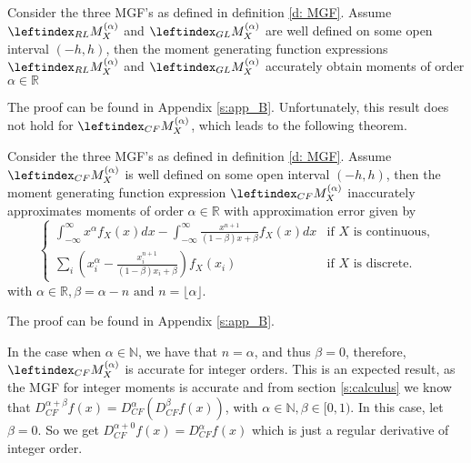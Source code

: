 \begin{theorem}\label{t: MGF_accurate}
     Consider the three MGF's as defined in definition \ref{d: MGF}. Assume \(\leftindex_{RL}{M}_X^{(\alpha)}\) and \(\leftindex_{GL}{M}_X^{(\alpha)}\) are well defined on some open interval \((-h, h)\), then the moment generating function expressions \(\leftindex_{RL}{M}_X^{(\alpha)}\) and \(\leftindex_{GL}{M}_X^{(\alpha)}\) accurately obtain moments of order \(\alpha \in \mathbb{R}\)
    
\end{theorem}
The proof can be found in Appendix \ref{s:app_B}.
\newline
Unfortunately, this result does not hold for \(\leftindex_{CF}{M}_X^{(\alpha)}\), which leads to the following theorem.

\begin{theorem}\label{t: MGF_inaccurate}
    Consider the three MGF's as defined in definition \ref{d: MGF}. Assume \(\leftindex_{CF}{M}_X^{(\alpha)}\) is well defined on some open interval \((-h, h)\), then the moment generating function expression \(\leftindex_{CF}{M}_X^{(\alpha)}\) inaccurately approximates moments of order \(\alpha \in \mathbb{R}\) with approximation error given by
    \[
\begin{cases} 
    \displaystyle \int_{-\infty}^{\infty} x^\alpha  f_X(x) dx -  \displaystyle \int_{-\infty}^{\infty}  \frac{x^{n+1} }{(1 - \beta)x + \beta} f_X(x) dx & \text{if } X \text{ is continuous,} \\ 
    \displaystyle \sum_{i} \left(x_i^\alpha -  \frac{x_i^{n+1} }{(1 - \beta)x_i + \beta}\right) f_X(x_i) & \text{if } X \text{ is discrete.} 
\end{cases}
\] with \(\alpha \in \mathbb{R}, \beta = \alpha - n \text{ and } n = \lfloor \alpha \rfloor.\)
    
\end{theorem}
The proof can be found in Appendix \ref{s:app_B}.

\begin{remark}
    In the case when \(\alpha \in \mathbb{N}\), we have that \(n = \alpha\), and thus \( \beta = 0\), therefore, \(\leftindex_{CF}{M}_X^{(\alpha)}\) is accurate for integer orders. This is an expected result, as the MGF for integer moments is accurate and from section \ref{s:calculus} we know that \(D_{CF}^{\alpha + \beta}f(x) = D_{CF}^\alpha(D_{CF}^\beta f(x))\), with \(\alpha \in \mathbb{N}, \beta \in [0, 1).\) In this case, let \(\beta = 0\). So we get \(D_{CF}^{\alpha + 0}f(x) = D_{CF}^{\alpha}f(x)\) which is just a regular derivative of integer order.
\end{remark}
